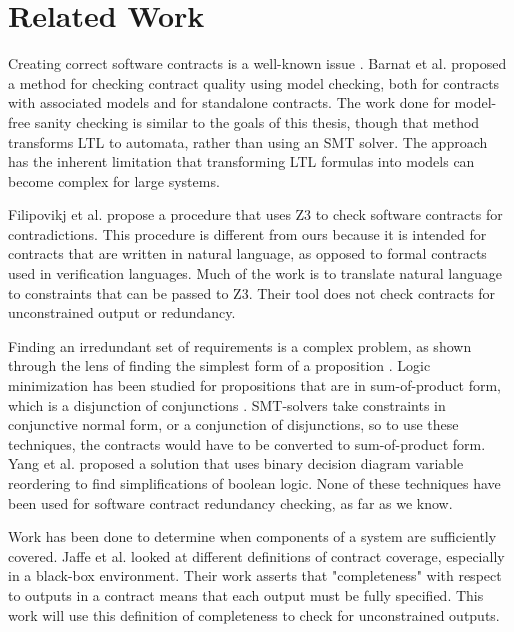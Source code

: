 \documentclass{article}
\begin{document}
\section{Related Work}

Creating correct software contracts is a well-known issue \cite{rozier2016specification} \cite{kupferman2006sanity}.
Barnat et al. \cite{barnat2012checking} \cite{barnat2016analysing} proposed a method for checking contract quality using model checking,
both for contracts with associated models and for standalone contracts. The work done for model-free sanity checking is
similar to the goals of this thesis, though that method transforms LTL to automata, rather than using an SMT solver. The approach
has the inherent limitation that transforming LTL formulas into models can become complex for large systems.

Filipovikj et al. \cite{filipovikj2017smt} propose a procedure that uses Z3 \cite{de2008z3} to check software contracts
for contradictions. This procedure is different from ours because it is intended for contracts that are written in
natural language, as opposed to formal contracts used in verification languages. Much of the work is to translate
natural language to constraints that can be passed to Z3. Their tool does not check contracts
for unconstrained output or redundancy. 

Finding an irredundant set of requirements is a complex problem, as shown through the lens of finding the simplest form 
of a proposition \cite{umans2006complexity}. Logic minimization has been studied for propositions that are in sum-of-product form, which is a 
disjunction of conjunctions \cite{coudert1994two}. SMT-solvers take constraints in conjunctive normal form, or a conjunction of disjunctions, so to use these 
techniques, the contracts would have to be converted to sum-of-product form. Yang et al. \cite{yang2000bds} proposed a solution that uses binary 
decision diagram \cite{akers1978functional} variable reordering to 
find simplifications of boolean logic. None of these techniques have been used for software contract redundancy checking, as far as we know.

Work has been done to determine when components of a system are sufficiently covered. Jaffe et al. \cite{jaffe1989completeness}
looked at different definitions of contract coverage, especially in a black-box environment. Their work asserts that "completeness"
with respect to outputs in a contract means that each output must be fully specified. This work will use this definition of
completeness to check for unconstrained outputs.
\end{document}
